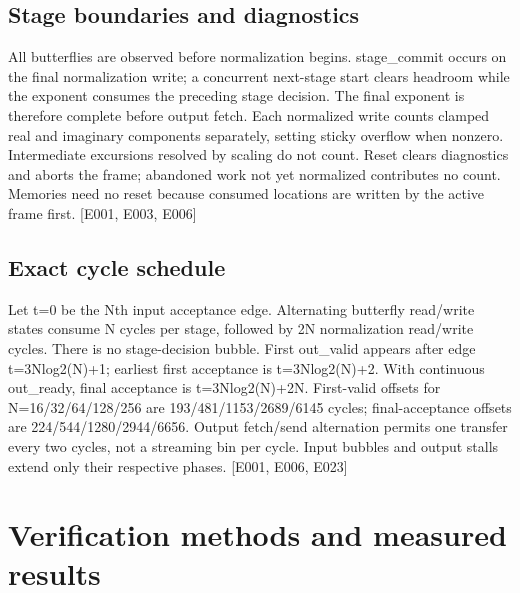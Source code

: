 \documentclass[11pt,a4paper]{article}
\begin{document}
\subsection{Stage boundaries and diagnostics}

All butterflies are observed before normalization begins. stage\_\allowbreak{}commit occurs on the final normalization write; a concurrent next-stage start clears headroom while the exponent consumes the preceding stage decision. The final exponent is therefore complete before output fetch. Each normalized write counts clamped real and imaginary components separately,\allowbreak{} setting sticky overflow when nonzero. Intermediate excursions resolved by scaling do not count. Reset clears diagnostics and aborts the frame; abandoned work not yet normalized contributes no count. Memories need no reset because consumed locations are written by the active frame first. [\allowbreak{}E001,\allowbreak{} E003,\allowbreak{} E006]\allowbreak{}

\subsection{Exact cycle schedule}

Let t=\allowbreak{}0 be the Nth input acceptance edge. Alternating butterfly read/\allowbreak{}write states consume N cycles per stage,\allowbreak{} followed by 2N normalization read/\allowbreak{}write cycles. There is no stage-decision bubble. First out\_\allowbreak{}valid appears after edge t=\allowbreak{}3Nlog2(\allowbreak{}N)\allowbreak{}+\allowbreak{}1; earliest first acceptance is t=\allowbreak{}3Nlog2(\allowbreak{}N)\allowbreak{}+\allowbreak{}2. With continuous out\_\allowbreak{}ready,\allowbreak{} final acceptance is t=\allowbreak{}3Nlog2(\allowbreak{}N)\allowbreak{}+\allowbreak{}2N. First-valid offsets for N=\allowbreak{}16/\allowbreak{}32/\allowbreak{}64/\allowbreak{}128/\allowbreak{}256 are 193/\allowbreak{}481/\allowbreak{}1153/\allowbreak{}2689/\allowbreak{}6145 cycles; final-acceptance offsets are 224/\allowbreak{}544/\allowbreak{}1280/\allowbreak{}2944/\allowbreak{}6656. Output fetch/\allowbreak{}send alternation permits one transfer every two cycles,\allowbreak{} not a streaming bin per cycle. Input bubbles and output stalls extend only their respective phases. [\allowbreak{}E001,\allowbreak{} E006,\allowbreak{} E023]\allowbreak{}

\section{Verification methods and measured results}
\end{document}
